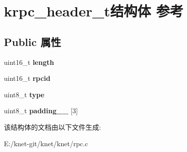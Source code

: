 \hypertarget{structkrpc__header__t}{}\section{krpc\+\_\+header\+\_\+t结构体 参考}
\label{structkrpc__header__t}
\subsection*{Public 属性}
\begin{DoxyCompactItemize}
\item 
\hypertarget{structkrpc__header__t_ae2e8cebd7eb0f5bedb16f50d5f4ec57a}{}uint16\+\_\+t {\bfseries length}\label{structkrpc__header__t_ae2e8cebd7eb0f5bedb16f50d5f4ec57a}

\item 
\hypertarget{structkrpc__header__t_ad66b54992a2bf517e69ea69dc2dd9df5}{}uint16\+\_\+t {\bfseries rpcid}\label{structkrpc__header__t_ad66b54992a2bf517e69ea69dc2dd9df5}

\item 
\hypertarget{structkrpc__header__t_a1f3697ad067fb01b51587878f8f8a87d}{}uint8\+\_\+t {\bfseries type}\label{structkrpc__header__t_a1f3697ad067fb01b51587878f8f8a87d}

\item 
\hypertarget{structkrpc__header__t_a69c014b15d9dd075d2bad2b81572cc5f}{}uint8\+\_\+t {\bfseries padding\+\_\+\+\_\+} \mbox{[}3\mbox{]}\label{structkrpc__header__t_a69c014b15d9dd075d2bad2b81572cc5f}

\end{DoxyCompactItemize}


该结构体的文档由以下文件生成\+:\begin{DoxyCompactItemize}
\item 
E\+:/knet-\/git/knet/knet/rpc.\+c\end{DoxyCompactItemize}
